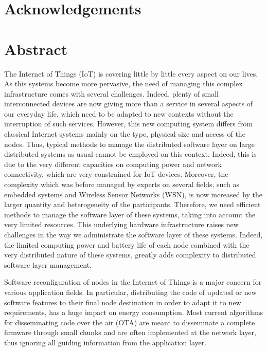 \chapter*{Acknowledgements}

\chapter*{Abstract}
The Internet of Things (IoT) is covering little by little every aspect on our lives.
As this systems become more pervasive, the need of managing this complex infrastructure comes with several challenges.
Indeed, plenty of small interconnected devices are now giving more than a service in several aspects of our everyday life, which need to be adapted to new contexts without the interruption of such services.
However, this new computing system differs from classical Internet systems mainly on the type, physical size and access of the nodes.
Thus, typical methods to manage the distributed software layer on large distributed systems as usual cannot be employed on this context.
Indeed, this is due to the very different capacities on computing power and network connectivity, which are very constrained for IoT devices.
Moreover, the complexity which was before managed by experts on several fields, such as embedded systems and Wireless Sensor Networks (WSN), is now increased by the larger quantity and heterogeneity of the participants.
Therefore, we need efficient methods to manage the software layer of these systems, taking into account the very limited resources.
This underlying hardware infrastructure raises new challenges in the way we administrate the software layer of these systems.
Indeed, the limited computing power and battery life of each node combined with the very distributed nature of these systems, greatly adds complexity to distributed software layer management.

Software reconfiguration of nodes in the Internet of Things is a major concern for various application fields.
In particular, distributing the code of updated or new software features to their final node destination in order to adapt it to new requirements, has a huge impact on energy consumption.
Most current algorithms for disseminating code over the air (OTA) are meant to disseminate a complete firmware through small chunks  and are often implemented at the network layer, thus ignoring all guiding information from the application layer.

